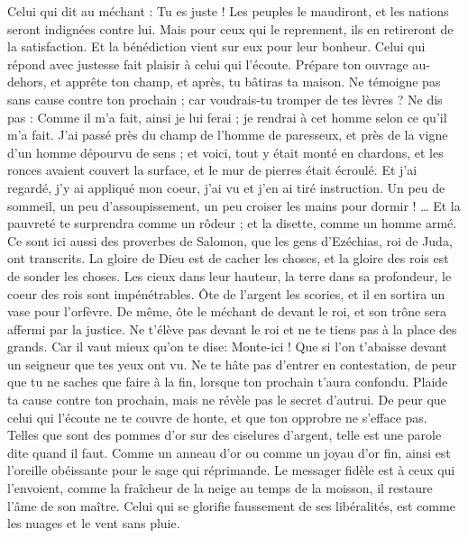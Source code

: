 \begin{multicols}{2}
Celui qui dit au méchant : Tu es juste ! Les peuples le maudiront, et les nations seront indignées contre lui.
Mais pour ceux qui le reprennent, ils en retireront de la satisfaction. Et la bénédiction vient sur eux pour leur bonheur.
Celui qui répond avec justesse fait plaisir à celui qui l'écoute.
Prépare ton ouvrage au-dehors, et apprête ton champ, et après, tu bâtiras ta maison.
Ne témoigne pas sans cause contre ton prochain ; car voudrais-tu tromper de tes lèvres ?
Ne dis pas : Comme il m'a fait, ainsi je lui ferai ; je rendrai à cet homme selon ce qu'il m'a fait.
J'ai passé près du champ de l'homme de paresseux, et près de la vigne d'un homme dépourvu de sens ;
et voici, tout y était monté en chardons, et les ronces avaient couvert la surface, et le mur de pierres était écroulé.
Et j'ai regardé, j'y ai appliqué mon coeur, j'ai vu et j'en ai tiré instruction.
Un peu de sommeil, un peu d'assoupissement, un peu croiser les mains pour dormir ! …
Et la pauvreté te surprendra comme un rôdeur ; et la disette, comme un homme armé.
\VerseOne{}Ce sont ici aussi des proverbes de Salomon, que les gens d'Ezéchias, roi de Juda, ont transcrits.
La gloire de Dieu est de cacher les choses, et la gloire des rois est de sonder les choses.
Les cieux dans leur hauteur, la terre dans sa profondeur, le coeur des rois sont impénétrables.
Ôte de l'argent les scories, et il en sortira un vase pour l'orfèvre.
 De même, ôte le méchant de devant le roi, et son trône sera affermi par la justice.
Ne t'élève pas devant le roi et ne te tiens pas à la place des grands.
Car il vaut mieux qu'on te dise: Monte-ici ! Que si l'on t'abaisse devant un seigneur que tes yeux ont vu.
Ne te hâte pas d'entrer en contestation, de peur que tu ne saches que faire à la fin, lorsque ton prochain t'aura confondu.
Plaide ta cause contre ton prochain, mais ne révèle pas le secret d'autrui.
De peur que celui qui l'écoute ne te couvre de honte, et que ton opprobre ne s'efface pas.
Telles que sont des pommes d'or sur des ciselures d'argent, telle est une parole dite quand il faut.
Comme un anneau d'or ou comme un joyau d'or fin, ainsi est l'oreille obéissante pour le sage qui réprimande.
Le messager fidèle est à ceux qui l'envoient, comme la fraîcheur de la neige au temps de la moisson, il restaure l'âme de son maître.
Celui qui se glorifie faussement de ses libéralités, est comme les nuages et le vent sans pluie.

\end{multicols}
